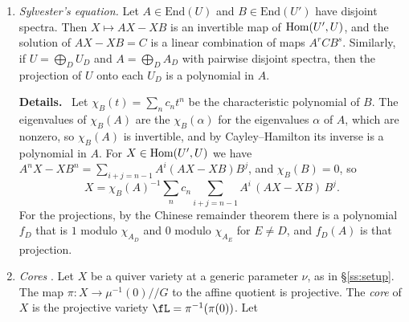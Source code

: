 \documentclass[11pt]{amsart}
\newenvironment{details}{\par\color{black!60!green}\noindent\textbf{Details.}\ }{\par}
\begin{document}
\begin{enumerate}[leftmargin=2.6em,label=(I\arabic*)]
\begin{enumerate}[label=(\alph*)]
\item Let a finite group $H$ act linearly on a complex vector space $U$.  The
average $\Av_H=|H|^{-1}\sum_{h\in H}h$ is an $H$-equivariant projection of $U$
onto $U^H$.  So for an $H$-stable subspace $U'\subseteq U$ we have
$\Av_H(U')=U'^H$ and $(U/U')^H=U^H/U'^H$.
\item The symmetric polynomials in $n$ variables are generated by the power
sums of degrees $1,\dots,n$ (Newton's identities).
\item Let $C=\bigoplus_{i\ge0}C_i$ be a finite-dimensional graded commutative
algebra with $C_0=\C$, and $C_+=\bigoplus_{i>0}C_i$.  The \emph{socle} of $C$
is the annihilator of $C_+$, and $C$ is \emph{level} if its socle is its top
nonzero degree.  Every nonzero graded ideal $K$ of $C$ meets the socle.
\begin{details}
If $x\in K$ is homogeneous and nonzero of the largest degree
occurring in $K$, then $C_+x\subseteq K$ lies in higher degrees, so
$C_+x=0$.
\end{details}
\end{enumerate}
\item\label{I:sylv} \emph{Sylvester's equation.}  Let $A\in\mathrm{End}(U)$
and $B\in\mathrm{End}(U')$ have disjoint spectra.  Then $X\mapsto AX-XB$ is an
invertible map of $\operatorname{Hom}(U',U)$, and the solution of $AX-XB=C$ is a linear
combination of maps $A^rCB^s$.  Similarly, if $U=\bigoplus_DU_D$ and
$A=\bigoplus_DA_D$ with pairwise disjoint spectra, then the projection of
$U$ onto each $U_D$ is a polynomial in $A$.
\begin{details}
Let $\chi_B(t)=\sum_nc_nt^n$ be the characteristic polynomial of $B$.  The
eigenvalues of $\chi_B(A)$ are the $\chi_B(\alpha)$ for the eigenvalues
$\alpha$ of $A$, which are nonzero, so $\chi_B(A)$ is invertible, and by
Cayley--Hamilton its inverse is a polynomial in $A$.  For
$X\in\operatorname{Hom}(U',U)$ we have
$A^nX-XB^n=\sum_{i+j=n-1}A^i(AX-XB)B^j$, and $\chi_B(B)=0$, so
\[
 X=\chi_B(A)^{-1}\sum_nc_n\sum_{i+j=n-1}A^i\,(AX-XB)\,B^j .
\]
For the projections, by the Chinese remainder
theorem there is a polynomial $f_D$ that is $1$ modulo $\chi_{A_D}$ and $0$
modulo $\chi_{A_E}$ for $E\neq D$, and $f_D(A)$ is that projection.
\end{details}
\item\label{I:core} \emph{Cores} \cite{hauselCohomologyLarge2013}.  Let $X$ be a quiver variety
at a generic parameter $\nu$, as in \S\ref{ss:setup}.  The map
$\pi\colon X\to\mu^{-1}(0)/\!/G$ to the affine quotient is projective.  The
\emph{core} of $X$ is the projective variety $\fL=\pi^{-1}(\pi(0))$.  Let

\end{enumerate}
\end{document}

